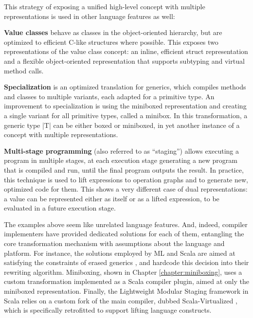 This strategy of exposing a unified high-level concept with multiple representations is used in other language features as well:

\textbf{Value classes} \cite{gosling-value-classes, dot-net-value-types-www, sip-value-classes} behave as classes in the object-oriented hierarchy, but are optimized to efficient C-like structures \cite{cxx-stroustrup} where possible. This exposes two representations of the value class concept: an inline, efficient struct representation and a flexible object-oriented representation that supports subtyping and virtual method calls.

\textbf{Specialization} \cite{specialization-iuli, iuli-thesis, goetz-specialization} is an optimized translation for generics, which compiles methods and classes to multiple variants, each adapted for a primitive type. An improvement to specialization is using the miniboxed representation and creating a single variant for all primitive types, called a minibox. In this transformation, a generic type |T| can be either boxed or miniboxed, in yet another instance of a concept with multiple representations.

\textbf{Multi-stage programming} (also referred to as ``staging'') \cite{taha-intro} allows executing a program in multiple stages, at each execution stage generating a new program that is compiled and run, until the final program outputs the result. In practice, this technique is used to lift expressions to operation graphs and to generate new, optimized code for them. This shows a very different case of dual representations: a value can be represented either as itself or as a lifted expression, to be evaluated in a future execution stage.

The examples above seem like unrelated language features. And, indeed, compiler implementers have provided dedicated solutions for each of them, entangling the core transformation mechanism with assumptions about the language and platform. For instance, the solutions employed by ML and Scala are aimed at satisfying the constraints of erased generics \cite{java-erasure, leroy-unboxed-objects, thiemann-unboxed-objects-cps}, and hardcode this decision into their rewriting algorithm. Miniboxing, shown in Chapter \ref{chapter:miniboxing}, uses a custom transformation implemented as a Scala compiler plugin, aimed at only the miniboxed representation. Finally, the Lightweight Modular Staging framework \cite{tiark-lms} in Scala relies on a custom fork of the main compiler, dubbed Scala-Virtualized \cite{scala-virtualized}, which is specifically retrofitted to support lifting language constructs.

